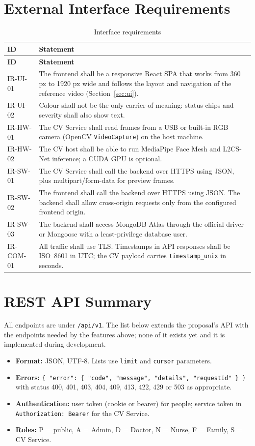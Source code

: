 \documentclass[a4paper,11pt]{scrreprt}
\makeatletter
\newcommand{\code}[1]{\texttt{#1}}
\newenvironment{idtable}[1]{%
  \small
  \begin{longtable}{@{}>{\ttfamily\footnotesize}p{1.9cm}>{\raggedright\arraybackslash}p{13.2cm}@{}}
  \caption{#1}\\
  \toprule \textbf{ID} & \textbf{Statement}\\ \midrule
  \endfirsthead
  \toprule \textbf{ID} & \textbf{Statement}\\ \midrule
  \endhead
  \bottomrule
  \endfoot
}{%
  \end{longtable}\normalsize
}
\newcommand{\idr}[2]{#1 & #2 \\ \midrule}
\makeatother
\begin{document}
\section{External Interface Requirements}
\begin{idtable}{Interface requirements}
\idr{IR-UI-01}{The frontend shall be a responsive React SPA that works from 360 px to 1920 px wide and follows the layout and navigation of the reference video (Section~\ref{sec:ui}).}
\idr{IR-UI-02}{Colour shall not be the only carrier of meaning: status chips and severity shall also show text.}
\idr{IR-HW-01}{The CV Service shall read frames from a USB or built-in RGB camera (OpenCV \code{VideoCapture}) on the host machine.}
\idr{IR-HW-02}{The CV host shall be able to run MediaPipe Face Mesh and L2CS-Net inference; a CUDA GPU is optional.}
\idr{IR-SW-01}{The CV Service shall call the backend over HTTPS using JSON, plus multipart/form-data for preview frames.}
\idr{IR-SW-02}{The frontend shall call the backend over HTTPS using JSON. The backend shall allow cross-origin requests only from the configured frontend origin.}
\idr{IR-SW-03}{The backend shall access MongoDB Atlas through the official driver or Mongoose with a least-privilege database user.}
\idr{IR-COM-01}{All traffic shall use TLS. Timestamps in API responses shall be ISO~8601 in UTC; the CV payload carries \code{timestamp_unix} in seconds.}
\end{idtable}

\section{REST API Summary}\label{sec:api}
All endpoints are under \code{/api/v1}. The list below extends the proposal's API with the endpoints needed by the features above; none of it exists yet and it is implemented during development.

\begin{itemize}
  \item \textbf{Format:} JSON, UTF-8. Lists use \code{limit} and \code{cursor} parameters.
  \item \textbf{Errors:} \code{\{ "error": \{ "code", "message", "details", "requestId" \} \}} with status 400, 401, 403, 404, 409, 413, 422, 429 or 503 as appropriate.
  \item \textbf{Authentication:} user token (cookie or bearer) for people; service token in \code{Authorization: Bearer} for the CV Service.
  \item \textbf{Roles:} P = public, A = Admin, D = Doctor, N = Nurse, F = Family, S = CV Service.
\end{itemize}
\end{document}
